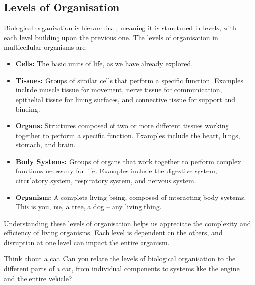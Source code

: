 \subsection{Levels of Organisation}

Biological organisation is hierarchical, meaning it is structured in levels, with each level building upon the previous one.  The levels of organisation in multicellular organisms are:

\begin{itemize}
    \item \textbf{Cells:} The basic units of life, as we have already explored.
    \item \textbf{Tissues:} Groups of similar cells that perform a specific function. Examples include muscle tissue for movement, nerve tissue for communication, epithelial tissue for lining surfaces, and connective tissue for support and binding. 
    \item \textbf{Organs:} Structures composed of two or more different tissues working together to perform a specific function. Examples include the heart, lungs, stomach, and brain.  
    \item \textbf{Body Systems:} Groups of organs that work together to perform complex functions necessary for life. Examples include the digestive system, circulatory system, respiratory system, and nervous system.  
    \item \textbf{Organism:} A complete living being, composed of interacting body systems.  This is you, me, a tree, a dog – any living thing. 
\end{itemize}

Understanding these levels of organisation helps us appreciate the complexity and efficiency of living organisms.  Each level is dependent on the others, and disruption at one level can impact the entire organism.

\begin{stopandthink}
Think about a car. Can you relate the levels of biological organisation to the different parts of a car, from individual components to systems like the engine and the entire vehicle?
\end{stopandthink}



